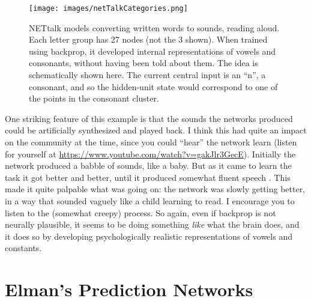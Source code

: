 \begin{figure}[h]
\centering
\texttt{[image: images/netTalkCategories.png]}
\caption[Pamela Payne and Jeff Yoshimi.]{NETtalk models converting written words to sounds, \ie reading aloud. Each letter group has 27 nodes (not the 3 shown). When trained using backprop, it developed internal representations of vowels and consonants, without having been told about them. The idea is schematically shown here. The current central input is an ``n'', a consonant, and so the hidden-unit state would correspond to one of the points in the consonant cluster.}
\label{net_talk}
\end{figure}

One striking feature of this example is that the sounds the networks produced could be artificially synthesized and played back.  I think this had quite an impact on the community at the time, since you could ``hear'' the network learn (listen for yourself at  \url{https://www.youtube.com/watch?v=gakJlr3GecE}). Initially the network produced a babble of sounds, like a baby. But as it came to learn the task it got better and better, until it produced somewhat fluent speech \cite{sejnowski1987parallel}. This made it quite palpable what was going on: the network was slowly getting better, in a way that sounded vaguely like a child learning to read. I encourage you to listen to the (somewhat creepy) process. So again, even if backprop is not neurally plausible, it seems to be doing something \emph{like} what the brain does, and it does so by developing psychologically realistic representations of vowels and constants.

\section{Elman's Prediction Networks}


